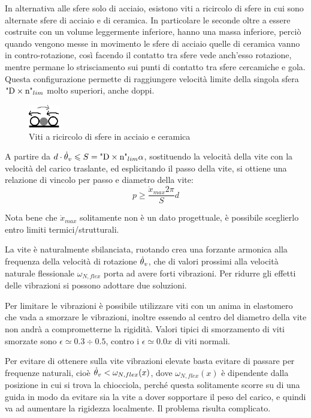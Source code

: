 In alternativa alle sfere solo di acciaio, esistono viti a ricircolo di sfere in cui sono alternate sfere di acciaio e di ceramica. In particolare le seconde oltre a essere costruite con un volume leggermente inferiore, hanno una massa inferiore, perciò quando vengono messe in movimento le sfere di acciaio quelle di ceramica vanno in contro-rotazione, così facendo il contatto tra sfere vede anch'esso rotazione, mentre permane lo strisciamento sui punti di contatto tra sfere cercamiche e gola. Questa configurazione permette di raggiungere velocità limite della singola sfera \( \text{"D}\times \text{n"}_{lim} \) molto superiori, anche doppi.

\begin{figure}[h]
    \centering
    \includegraphics[width=0.12\textwidth]{Immagini/Viti_A_C.png}
    \caption{Viti a ricircolo di sfere in acciaio e ceramica}
\end{figure}

A partire da \( d\cdot \dot{\theta}_v \leqslant S = \text{"D}\times \text{n"}_{lim} \alpha \), sostituendo la velocità della vite con la velocità del carico traslante, ed esplicitando il passo della vite, si ottiene una relazione di vincolo per passo e diametro della vite:
\[ p \geqslant \frac{\dot{x}_{max} 2\pi }{S} d \]

Nota bene che \(\dot{x}_{max}\) solitamente non è un dato progettuale, è possibile sceglierlo entro limiti termici/strutturali.

La vite è naturalmente sbilanciata, ruotando crea una forzante armonica alla frequenza della velocità di rotazione \( \dot{\theta}_v \), che di valori prossimi alla velocità naturale flessionale \(\omega_{N,flex}\) porta ad avere forti vibrazioni.
Per ridurre gli effetti delle vibrazioni si possono adottare due soluzioni.

Per limitare le vibrazioni è possibile utilizzare viti con un anima in elastomero che vada a smorzare le vibrazioni, inoltre essendo al centro del diametro della vite non andrà a comprometterne la rigidità. Valori tipici di smorzamento di viti smorzate sono \(\epsilon \simeq 0.3 \div 0.5\), contro i \(\epsilon \simeq 0.0x \) di viti normali.

Per evitare di ottenere sulla vite vibrazioni elevate basta evitare di passare per frequenze naturali, cioè \( \dot{\theta}_v < \omega_{N,flex}(x) \), dove \( \omega_{N,flex}(x) \) è dipendente dalla posizione in cui si trova la chiocciola, perché questa solitamente scorre su di una guida in modo da evitare sia la vite a dover sopportare il peso del carico, e quindi va ad aumentare la rigidezza localmente. Il problema risulta complicato.

